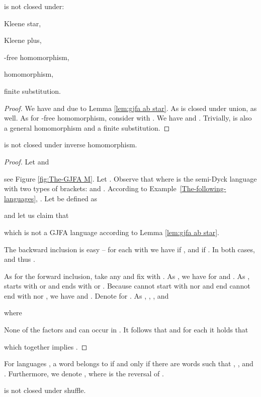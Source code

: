 \documentclass{ws-ijmpc}
\begin{document}
\begin{theorem}
 is not closed under:\end{theorem}
\begin{romanlist}
\item Kleene star,
\item Kleene plus,
\item -free homomorphism,
\item homomorphism,
\item finite substitution.\end{romanlist}
\begin{proof}
We have  and 
due to Lemma \ref{lem:gjfa ab star}. As  is closed
under union,  as well.
As for -free homomorphism, consider 
with . We have 
and .
Trivially,  is also a general homomorphism and a finite
substitution.\end{proof}
\begin{theorem}
\label{inv hom} is not closed under inverse homomorphism. \end{theorem}
\begin{proof}
Let 
and 

see Figure \ref{fig:The-GJFA M}. Let .
Observe that  where 
is the semi-Dyck language with two types of brackets: 
and . According to Example~\ref{The-following-languages},
. Let 
be defined as

and let us claim that 

which is not a GJFA language according to Lemma \ref{lem:gjfa ab star}.

The backward inclusion is easy -- for each 
with  we have 
if , and  if . In
both cases,  and thus . 

As for the forward inclusion, take any 
and fix  with . As ,
we have  for  and .
As ,  starts with 
or  and ends with  or . Because
 cannot start with  nor 
and end  cannot end with  nor , we
have  and .
Denote  for .
As , , , and

where

None of the factors  and 
can occur in . It follows that  and for each 
it holds that 

which together implies .
\end{proof}
For languages , a word 
belongs to  if and only if there
are words 
such that , ,
and . Furthermore, we denote
, where
 is the reversal of .
\begin{theorem}
\label{thm: GJFA unary shuffle} is not closed under
shuffle.\end{theorem}
\end{document}
